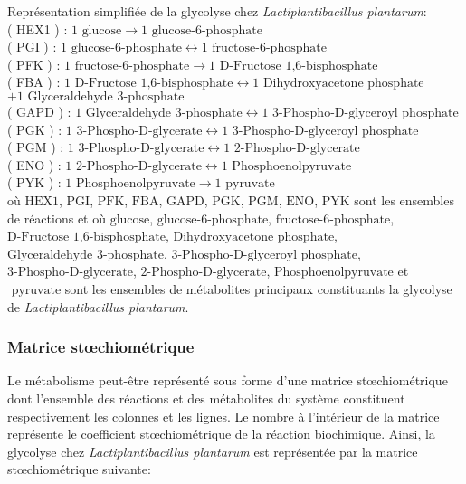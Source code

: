 \documentclass[../main.tex]{subfiles}
\begin{document}
Représentation simplifiée de la glycolyse chez \textit{Lactiplantibacillus plantarum}:\\
( HEX1 ) : $1\text{ glucose} \rightarrow 1\text{ glucose-6-phosphate}$\\
( PGI ) : $1\text{ glucose-6-phosphate} \leftrightarrow 1\text{ fructose-6-phosphate} $\\
( PFK ) : $1\text{ fructose-6-phosphate} \rightarrow 1\text{ D-Fructose 1,6-bisphosphate}$  \\
( FBA ) : $1\text{ D-Fructose 1,6-bisphosphate} \leftrightarrow 1\text{ Dihydroxyacetone phosphate}$\\$ + 1\text{ Glyceraldehyde 3-phosphate} $\\
( GAPD ) : $1\text{ Glyceraldehyde 3-phosphate}  \leftrightarrow 1\text{ 3-Phospho-D-glyceroyl phosphate} $\\
( PGK ) : $1\text{ 3-Phospho-D-glycerate} \leftrightarrow 1\text{ 3-Phospho-D-glyceroyl phosphate} $\\
( PGM ) : $1\text{ 3-Phospho-D-glycerate} \leftrightarrow  1\text{ 2-Phospho-D-glycerate} $\\
( ENO ) : $1\text{ 2-Phospho-D-glycerate} \leftrightarrow 1\text{ Phosphoenolpyruvate} $\\
( PYK ) : $1\text{ Phosphoenolpyruvate} \rightarrow 1\text{ pyruvate}$ \\

où $\text{HEX1}$, $\text{PGI}$, $\text{PFK}$, $\text{FBA}$, $\text{GAPD}$, $\text{PGK}$, $\text{PGM}$, $\text{ENO}$, $\text{PYK}$ sont les ensembles de réactions et où $\text{glucose}$, $\text{glucose-6-phosphate}$, $\text{fructose-6-phosphate}$, $\text{D-Fructose 1,6-bisphosphate}$, $\text{Dihydroxyacetone phosphate}$, $\text{Glyceraldehyde 3-phosphate}$, $\text{3-Phospho-D-glyceroyl phosphate}$, $\text{3-Phospho-D-glycerate}$, $\text{2-Phospho-D-glycerate}$, $\text{Phosphoenolpyruvate}$ et $\text{ pyruvate}$ sont les ensembles de métabolites principaux constituants la glycolyse de \textit{Lactiplantibacillus plantarum}.


\subsubsection{Matrice st\oe{}chiométrique}
Le métabolisme peut-être représenté sous forme d'une matrice st\oe{}chiométrique dont l'ensemble des réactions et des métabolites du système constituent respectivement les colonnes et les lignes. Le nombre à l'intérieur de la matrice représente le coefficient st\oe{}chiométrique de la réaction biochimique. Ainsi, la glycolyse chez \textit{Lactiplantibacillus plantarum} est représentée par la matrice st\oe{}chiométrique  suivante: 
\end{document}
